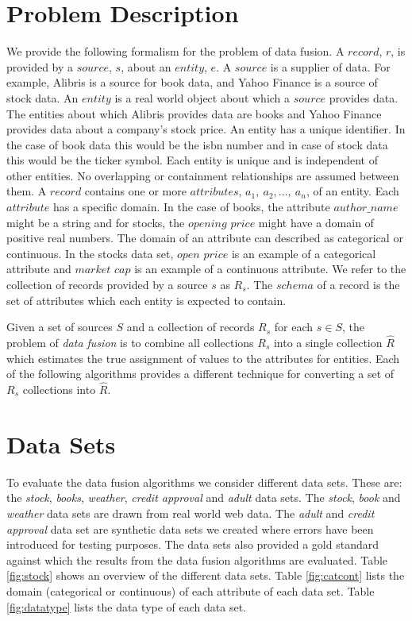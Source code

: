 \documentclass{acm_proc_article-sp}
\begin{document}
\section{Problem Description}
We provide the following formalism for the problem of data fusion. A $record$, $r$, is provided by a $source$, $s$, about an $entity$, $e$. A $source$ is a supplier of data. For example, Alibris is a source for book data, and Yahoo Finance is a source of stock data.  An $entity$ is a real world object about which a $source$ provides data. The entities about which Alibris provides data are books and Yahoo Finance provides data about a company's stock price. An entity has a unique identifier. In the case of book data this would be the isbn number and in case of stock data this would be the ticker symbol. Each entity is unique and is independent of other entities. No overlapping or containment relationships are assumed between them. A $record$ contains one or more $attributes$, $a_1,\ a_2,\dots,\ a_n$, of an entity. Each $attribute$ has a specific domain. In the case of books, the attribute $author\_name$ might be a string and for stocks, the $opening$ $price$ might have a domain of positive real numbers.  The domain of an attribute can described as categorical or continuous. In the stocks data set, $open$ $price$ is an example of a categorical attribute and $market$ $cap$  is an example of a continuous attribute. We refer to the collection of records provided by a source $s$ as $R_s$. The $schema$ of a record is the set of attributes which each entity is expected to contain. 


Given a set of sources $S$ and a collection of records $R_s$ for each $s \in S$, the problem of \emph{data fusion} is to combine all collections $R_s$ into a single collection $\hat{R}$ which estimates the true assignment of values to the attributes for entities.  Each of the following algorithms provides a different technique for converting a set of $R_s$ collections into $\hat{R}$. 

\section{Data Sets} \label{sec:data_sets}
To evaluate the data fusion algorithms we consider different data sets. These are: the \emph{stock}, \emph{books}, \emph{weather}, \emph{credit approval} and \emph{adult} data sets. The \emph{stock}, \emph{book} and \emph{weather} data sets are drawn from real world web data. The \emph{adult} and \emph{credit approval} data set are synthetic data sets we created where errors have been introduced for testing purposes. The data sets also provided a gold standard against which the results from the data fusion algorithms are evaluated. Table \ref{fig:stock} shows an overview of the different data sets. Table \ref{fig:catcont} lists the domain (categorical or continuous) of each attribute of each data set. Table \ref{fig:datatype} lists the data type of each data set.  \\
\end{document}
